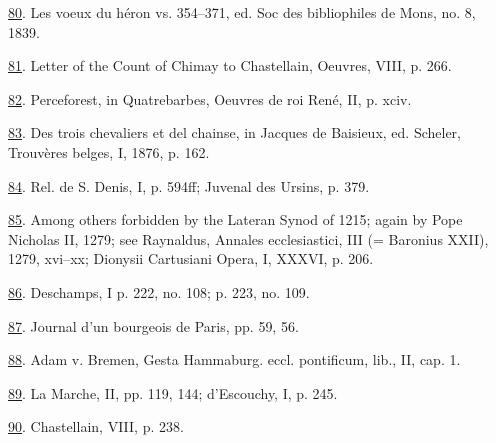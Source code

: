\protect\hypertarget{23_NOTES.xhtmlux5cux23id_1775}{\protect\hyperlink{10_Chapter_Three__THE_HEROIC_DREAM.xhtmlux5cux23id_1774}{80}}.
Les voeux du héron vs. 354--371, ed. Soc des bibliophiles de Mons, no.
8, 1839.

\protect\hypertarget{23_NOTES.xhtmlux5cux23id_1773}{\protect\hyperlink{10_Chapter_Three__THE_HEROIC_DREAM.xhtmlux5cux23id_1772}{81}}.
Letter of the Count of Chimay to Chastellain, Oeuvres, VIII, p. 266.

\protect\hypertarget{23_NOTES.xhtmlux5cux23id_1771}{\protect\hyperlink{10_Chapter_Three__THE_HEROIC_DREAM.xhtmlux5cux23id_1770}{82}}.
Perceforest, in Quatrebarbes, Oeuvres de roi René, II, p. xciv.

\protect\hypertarget{23_NOTES.xhtmlux5cux23id_1769}{\protect\hyperlink{10_Chapter_Three__THE_HEROIC_DREAM.xhtmlux5cux23id_1768}{83}}.
Des trois chevaliers et del chainse, in Jacques de Baisieux, ed.
Scheler, Trouvères belges, I, 1876, p. 162.

\protect\hypertarget{23_NOTES.xhtmlux5cux23id_1767}{\protect\hyperlink{10_Chapter_Three__THE_HEROIC_DREAM.xhtmlux5cux23id_1766}{84}}.
Rel. de S. Denis, I, p. 594ff; Juvenal des Ursins, p. 379.

\protect\hypertarget{23_NOTES.xhtmlux5cux23id_1765}{\protect\hyperlink{10_Chapter_Three__THE_HEROIC_DREAM.xhtmlux5cux23id_1764}{85}}.
Among others forbidden by the Lateran Synod of 1215; again by Pope
Nicholas II, 1279; see Raynaldus, Annales ecclesiastici, III (= Baronius
XXII), 1279, xvi--xx; Dionysii Cartusiani Opera, I, XXXVI, p. 206.

\protect\hypertarget{23_NOTES.xhtmlux5cux23id_1763}{\protect\hyperlink{10_Chapter_Three__THE_HEROIC_DREAM.xhtmlux5cux23id_1762}{86}}.
Deschamps, I p. 222, no. 108; p. 223, no. 109.

\protect\hypertarget{23_NOTES.xhtmlux5cux23id_1761}{\protect\hyperlink{10_Chapter_Three__THE_HEROIC_DREAM.xhtmlux5cux23id_1760}{87}}.
Journal d'un bourgeois de Paris, pp. 59, 56.

\protect\hypertarget{23_NOTES.xhtmlux5cux23id_1759}{\protect\hyperlink{10_Chapter_Three__THE_HEROIC_DREAM.xhtmlux5cux23id_1758}{88}}.
Adam v. Bremen, Gesta Hammaburg. eccl. pontificum, lib., II, cap. 1.

\protect\hypertarget{23_NOTES.xhtmlux5cux23id_1757}{\protect\hyperlink{10_Chapter_Three__THE_HEROIC_DREAM.xhtmlux5cux23id_1756}{89}}.
La Marche, II, pp. 119, 144; d'Escouchy, I, p. 245.

\protect\hypertarget{23_NOTES.xhtmlux5cux23id_1755}{\protect\hyperlink{10_Chapter_Three__THE_HEROIC_DREAM.xhtmlux5cux23id_1754}{90}}.
Chastellain, VIII, p. 238.

